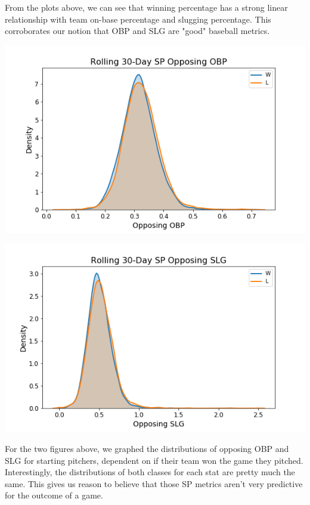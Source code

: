 \documentclass[12pt,onecolumn]{article}
\begin{document}
\noindent
From the plots above, we can see that winning percentage has a strong linear relationship with team on-base percentage and slugging percentage. This corroborates our notion that OBP and SLG are "good" baseball metrics.

\begin{center}
\includegraphics[scale=0.6]{sp_obp}
\end{center}

\begin{center}
\includegraphics[scale=0.6]{sp_slg}
\end{center}

\noindent
For the two figures above, we graphed the distributions of opposing OBP and SLG for starting pitchers, dependent on if their team won the game they pitched. Interestingly, the distributions of both classes for each stat are pretty much the same. This gives us reason to believe that those SP metrics aren't very predictive for the outcome of a game.
\end{document}
